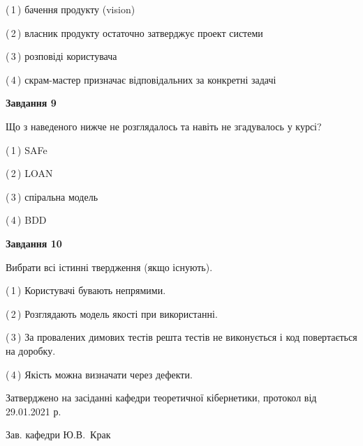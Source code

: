 \documentclass[10pt, ukrainian]{article}
\begin{document}
{\begin {large}
(\,1\,) бачення продукту (vision) %



(\,2\,) власник продукту остаточно затверджує проект системи%



(\,3\,) розповіді користувача%



(\,4\,) скрам-мастер призначає відповідальних за конкретні задачі%


{\begin {center}\textbf{Завдання 9}\end {center}}\par
Що з наведеного нижче не розглядалось та навіть не згадувалось у курсі?\par
\vspace{2mm}



(\,1\,) SAFe%



(\,2\,) LOAN%



(\,3\,) спіральна модель%



(\,4\,) BDD%


{\begin {center}\textbf{Завдання 10}\end {center}}\par
Вибрати всі істинні твердження (якщо існують).\par
\vspace{2mm}



(\,1\,) Користувачі бувають непрямими.%



(\,2\,) Розглядають модель якості при використанні.%



(\,3\,) За провалених димових тестів решта тестів не виконується і код повертається на доробку.%



(\,4\,) Якість можна визначати через дефекти.%



\end {large}}
{\vspace{5mm}\smallskip \begin {small} Затверджено на засіданні кафедри теоретичної кібернетики, протокол  від   29.01.2021 р.\par\smallskip\smallskip
{\parbox {6.5 cm}{Зав. кафедри \dotfill Ю.В.~Крак}} \end{small}}
\newpage
\end{document}
